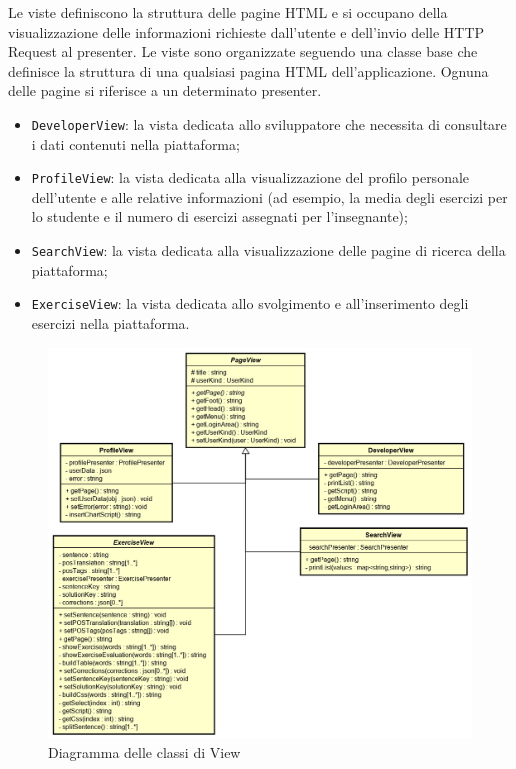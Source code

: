 Le viste definiscono la struttura delle pagine HTML e si occupano della visualizzazione delle informazioni richieste dall'utente e dell'invio delle HTTP Request al presenter. Le viste sono organizzate seguendo una classe base che definisce la struttura di una qualsiasi pagina HTML dell'applicazione. Ognuna delle pagine si riferisce a un determinato presenter.
\begin{itemize}
	\item \texttt{DeveloperView}: la vista dedicata allo sviluppatore che necessita di consultare i dati contenuti nella piattaforma; 
	\item \texttt{ProfileView}: la vista dedicata alla visualizzazione del profilo personale dell'utente e alle relative informazioni (ad esempio, la media degli esercizi per lo studente e il numero di esercizi assegnati per l'insegnante);
	\item \texttt{SearchView}: la vista dedicata alla visualizzazione delle pagine di ricerca della piattaforma;
	\item \texttt{ExerciseView}: la vista dedicata allo svolgimento e all'inserimento degli esercizi nella piattaforma.
\end{itemize}

\begin{figure}[h]
	\includegraphics[scale=0.60]{images/View.png}
	\caption{Diagramma delle classi di View}
\end{figure}
\newpage